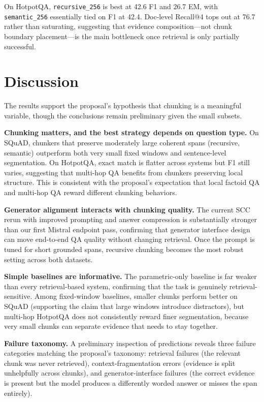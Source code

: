 \documentclass[11pt]{article}
\begin{document}
On HotpotQA, \texttt{recursive\_256} is best at 42.6 F1 and 26.7 EM, with \texttt{semantic\_256} essentially tied on F1 at 42.4. Doc-level Recall@4 tops out at 76.7 rather than saturating, suggesting that evidence composition---not chunk boundary placement---is the main bottleneck once retrieval is only partially successful.

\section{Discussion}

The results support the proposal's hypothesis that chunking is a meaningful variable, though the conclusions remain preliminary given the small subsets.

\textbf{Chunking matters, and the best strategy depends on question type.} On SQuAD, chunkers that preserve moderately large coherent spans (recursive, semantic) outperform both very small fixed windows and sentence-level segmentation. On HotpotQA, exact match is flatter across systems but F1 still varies, suggesting that multi-hop QA benefits from chunkers preserving local structure. This is consistent with the proposal's expectation that local factoid QA and multi-hop QA reward different chunking behaviors.

\textbf{Generator alignment interacts with chunking quality.} The current SCC rerun with improved prompting and answer compression is substantially stronger than our first Mistral endpoint pass, confirming that generator interface design can move end-to-end QA quality without changing retrieval. Once the prompt is tuned for short grounded spans, recursive chunking becomes the most robust setting across both datasets.

\textbf{Simple baselines are informative.} The parametric-only baseline is far weaker than every retrieval-based system, confirming that the task is genuinely retrieval-sensitive. Among fixed-window baselines, smaller chunks perform better on SQuAD (supporting the claim that large windows introduce distractors), but multi-hop HotpotQA does not consistently reward finer segmentation, because very small chunks can separate evidence that needs to stay together.

\textbf{Failure taxonomy.} A preliminary inspection of predictions reveals three failure categories matching the proposal's taxonomy: retrieval failures (the relevant chunk was never retrieved), context-fragmentation errors (evidence is split unhelpfully across chunks), and generator-interface failures (the correct evidence is present but the model produces a differently worded answer or misses the span entirely).
\end{document}
